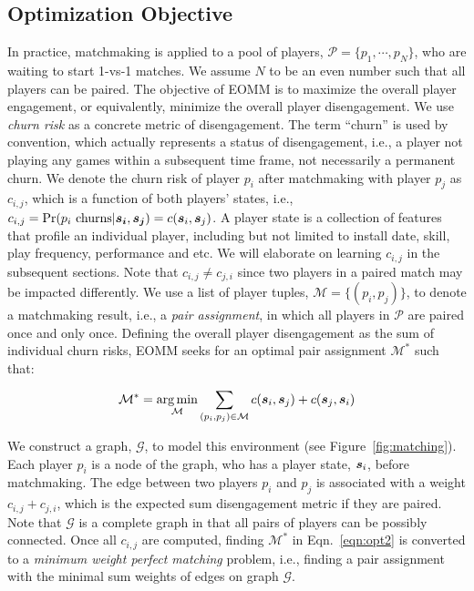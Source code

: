 \subsection{Optimization Objective}
In practice, matchmaking is applied to a pool of players, $\mathcal{P}=\{p_1, \cdots, p_N\}$, who are waiting to start 1-vs-1 matches. We assume $N$ to be an even number such that all players can be paired. The objective of EOMM is to maximize the overall player engagement, or equivalently, minimize the overall player disengagement. We use \emph{churn risk} as a concrete metric of disengagement. The term ``churn'' is used by convention, which actually represents a status of disengagement, i.e., a player not playing any games within a subsequent time frame, not necessarily a permanent churn. We denote the churn risk of player $p_i$ after matchmaking with player $p_j$ as $c_{i,j}$, which is a function of both players' states, i.e., $c_{i,j}=\Pr(p_i \text{ churns} | \boldsymbol{s_i}, \boldsymbol{s_j})=c(\boldsymbol{s}_i, \boldsymbol{s}_j)$. A player state is a collection of features that profile an individual player, including but not limited to install date, skill, play frequency, performance and etc. We will elaborate on learning $c_{i,j}$ in the subsequent sections. Note that $c_{i,j}\neq c_{j,i}$ since two players in a paired match may be impacted differently. We use a list of player tuples, $\mathcal{M}=\{(p_i,p_j)\}$, to denote a matchmaking result, i.e., a \textit{pair assignment}, in which all players in $\mathcal{P}$ are paired once and only once. Defining the overall player disengagement as the sum of individual churn risks, EOMM seeks for an optimal pair assignment $\mathcal{M}^*$ such that:

\begin{align}
\mathcal{M}^* = \operatorname*{arg\,min}_{\mathcal{M}} \sum\limits_{(p_i, p_j)\in \mathcal{M}} c(\boldsymbol{s}_i, \boldsymbol{s}_j) + c(\boldsymbol{s}_j, \boldsymbol{s}_i) \label{eqn:opt2}
\end{align}


We construct a graph, $\mathcal{G}$, to model this environment (see Figure~\ref{fig:matching}). Each player $p_i$ is a node of the graph, who has a player state, $\boldsymbol{s}_i$, before matchmaking. The edge between two players $p_i$ and $p_j$ is associated with a weight $c_{i,j} + c_{j,i}$, which is the expected sum disengagement metric if they are paired. Note that $\mathcal{G}$ is a complete graph in that all pairs of players can be possibly connected. Once all $c_{i,j}$ are computed, finding $\mathcal{M}^*$ in Eqn.~\ref{eqn:opt2} is converted to a \emph{minimum weight perfect matching} problem, i.e., finding a pair assignment with the minimal sum weights of edges on graph $\mathcal{G}$.

